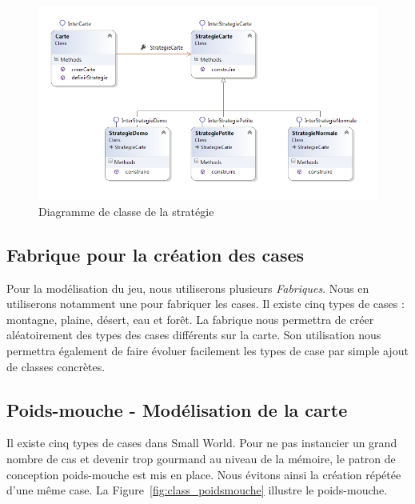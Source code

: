 \documentclass[a4paper]{article}%
\begin{document}
\begin{figure}[H]
    \centering
    \includegraphics[width=\textwidth]{./images/classe/strategie.png}
		\caption{Diagramme de classe de la stratégie}
		\label{fig:class_strategie}
\end{figure}

\subsection{Fabrique pour la création des cases}
Pour la modélisation du jeu, nous utiliserons plusieurs \textit{Fabriques}. 
Nous en utiliserons notamment une pour fabriquer les cases. Il existe cinq types de cases : montagne, plaine, désert, eau et forêt.
La fabrique nous permettra de créer aléatoirement des types des cases différents sur la carte.
Son utilisation nous permettra également de faire évoluer facilement les types de case par simple ajout de classes concrètes.


\subsection{Poids-mouche - Modélisation de la carte}

Il existe cinq types de cases dans Small World. Pour ne pas instancier un grand nombre de cas et devenir trop gourmand au niveau de la mémoire, le patron de conception poids-mouche est mis en place. Nous évitons ainsi la création répétée d'une même case. La Figure~\ref{fig:class_poidsmouche} illustre le poids-mouche.
\end{document}
